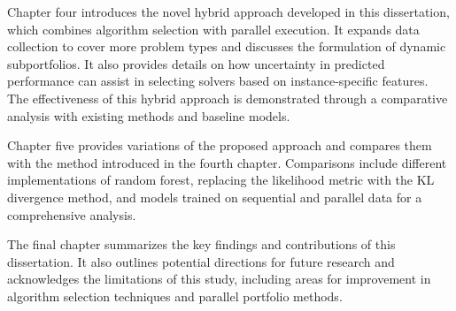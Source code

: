 Chapter four introduces the novel hybrid approach developed in this dissertation, which combines algorithm selection with parallel execution. It expands data collection to cover more problem types and discusses the formulation of dynamic subportfolios. It also provides details on how uncertainty in predicted performance can assist in selecting solvers based on instance-specific features. The effectiveness of this hybrid approach is demonstrated through a comparative analysis with existing methods and baseline models. 

Chapter five provides variations of the proposed approach and compares them with the method introduced in the fourth chapter. Comparisons include different implementations of random forest, replacing the likelihood metric with the KL divergence method, and models trained on sequential and parallel data for a comprehensive analysis.


The final chapter summarizes the key findings and contributions of this dissertation. It also outlines potential directions for future research and acknowledges the limitations of this study, including areas for improvement in algorithm selection techniques and parallel portfolio methods.
